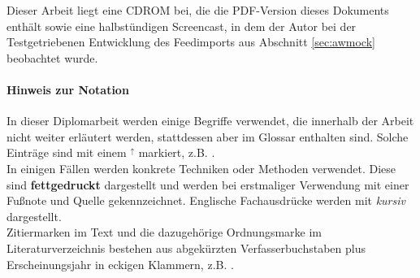 Dieser Arbeit liegt eine CDROM bei, die die PDF-Version dieses Dokuments enthält sowie eine halbstündigen Screencast, in dem der Autor bei der Testgetriebenen Entwicklung des Feedimports aus Abschnitt \ref{sec:awmock} beobachtet wurde.

\paragraph{Hinweis zur Notation} In dieser Diplomarbeit werden einige Begriffe verwendet, die innerhalb der Arbeit nicht weiter erläutert werden, stattdessen aber im Glossar enthalten sind. Solche Einträge sind mit einem $^\uparrow$ markiert, z.B. .\\
In einigen Fällen werden konkrete Techniken oder Methoden verwendet. Diese sind \textbf{fettgedruckt} dargestellt und werden bei erstmaliger Verwendung mit einer Fußnote und Quelle gekennzeichnet. Englische Fachausdrücke werden mit \textit{kursiv} dargestellt.\\
Zitiermarken im Text und die dazugehörige Ordnungsmarke im Literaturverzeichnis bestehen aus abgekürzten Verfasserbuchstaben plus Erscheinungsjahr in eckigen Klammern, z.B. \citep{beck_test_2002}.
